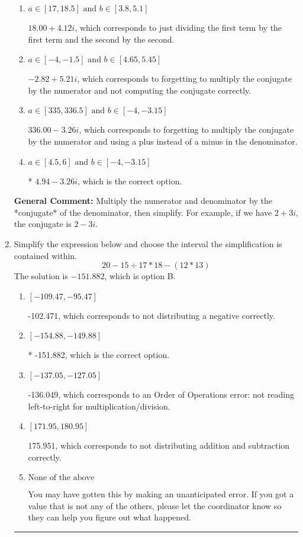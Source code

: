 \documentclass{extbook}[14pt]
\newcommand{\litem}[1]{\item #1

\rule{\textwidth}{0.4pt}}
\begin{document}
\begin{enumerate}
{\begin{enumerate}[label=\Alph*.]
 $4.94  - 222.00 i$, which corresponds to forgetting to multiply the conjugate by the numerator.
\item \( a \in [17, 18.5] \text{ and } b \in [3.8, 5.1] \)

 $18.00  + 4.12 i$, which corresponds to just dividing the first term by the first term and the second by the second.
\item \( a \in [-4, -1.5] \text{ and } b \in [4.65, 5.45] \)

 $-2.82  + 5.21 i$, which corresponds to forgetting to multiply the conjugate by the numerator and not computing the conjugate correctly.
\item \( a \in [335, 336.5] \text{ and } b \in [-4, -3.15] \)

 $336.00  - 3.26 i$, which corresponds to forgetting to multiply the conjugate by the numerator and using a plus instead of a minus in the denominator.
\item \( a \in [4.5, 6] \text{ and } b \in [-4, -3.15] \)

* $4.94  - 3.26 i$, which is the correct option.
\end{enumerate}

\textbf{General Comment:} Multiply the numerator and denominator by the *conjugate* of the denominator, then simplify. For example, if we have $2+3i$, the conjugate is $2-3i$.
}
\litem{
Simplify the expression below and choose the interval the simplification is contained within.
\[ 20 - 15 \div 17 * 18 - (12 * 13) \]The solution is \( -151.882 \), which is option B.\begin{enumerate}[label=\Alph*.]
\item \( [-109.47, -95.47] \)

 -102.471, which corresponds to not distributing a negative correctly.
\item \( [-154.88, -149.88] \)

* -151.882, which is the correct option.
\item \( [-137.05, -127.05] \)

 -136.049, which corresponds to an Order of Operations error: not reading left-to-right for multiplication/division.
\item \( [171.95, 180.95] \)

 175.951, which corresponds to not distributing addition and subtraction correctly.
\item \( \text{None of the above} \)

 You may have gotten this by making an unanticipated error. If you got a value that is not any of the others, please let the coordinator know so they can help you figure out what happened.
\end{enumerate}

}
\end{enumerate}
\end{document}
